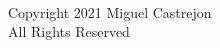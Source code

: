 

\chapter*{}
\hspace{1em}\vspace{18em} \\ %
\begin{center}
    Copyright {\textcopyright} 2021 Miguel Castrejon \\
    All Rights Reserved     
\end{center}


